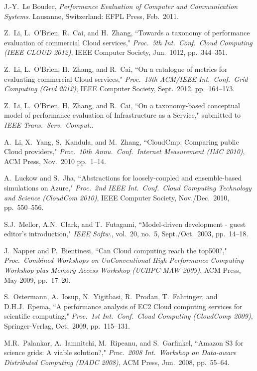 \documentclass[10pt, conference, compsocconf]{IEEEtran}
\begin{document}
\begin{thebibliography}{99}
J.-Y.~Le Boudec, \emph{Performance Evaluation of Computer and Communication Systems}. Lausanne, Switzerland: EFPL Press, Feb.~2011.

Z.~Li, L.~O'Brien, R.~Cai, and H.~Zhang, ``Towards a taxonomy of performance evaluation of commercial Cloud services," \emph{Proc.~5th Int.~Conf.~Cloud Computing (IEEE CLOUD 2012)}, IEEE Computer Society, Jun.~1012, pp.~344--351.

Z.~Li, L.~O'Brien, H.~Zhang, and R.~Cai, ``On a catalogue of metrics for evaluating commercial Cloud services," \emph{Proc.~13th ACM/IEEE Int.~Conf.~Grid Computing (Grid 2012)}, IEEE Computer Society, Sept.~2012, pp.~164--173.

Z.~Li, L.~O'Brien, H.~Zhang, and R.~Cai, ``On a taxonomy-based conceptual model of performance evaluation of Infrastructure as a Service," submitted to \emph{IEEE Trans.~Serv.~Comput.}.

A.~Li, X.~Yang, S.~Kandula, and M.~Zhang, ``CloudCmp: Comparing public Cloud providers," \emph{Proc.~10th Annu.~Conf.~Internet Measurement (IMC 2010)}, ACM Press, Nov.~2010 pp.~1--14.

A.~Luckow and S.~Jha, ``Abstractions for loosely-coupled and ensemble-based simulations on Azure," \emph{Proc.~2nd IEEE Int.~Conf.~Cloud Computing Technology and Science (CloudCom 2010)}, IEEE Computer Society, Nov./Dec.~2010, pp.~550--556.

S.J.~Mellor, A.N.~Clark, and T.~Futagami, ``Model-driven development - guest editor's introduction," \emph{IEEE Softw.}, vol.~20, no.~5, Sept./Oct.~2003, pp.~14--18.

J.~Napper and P.~Bientinesi, ``Can Cloud computing reach the top500?," \emph{Proc.~Combined Workshops on UnConventional High Performance Computing Workshop plus Memory Access Workshop (UCHPC-MAW 2009)}, ACM Press, May 2009, pp.~17--20.

S.~Ostermann, A.~Iosup, N.~Yigitbasi, R.~Prodan, T.~Fahringer, and D.H.J.~Epema, ``A performance analysis of EC2 Cloud computing services for scientific computing," \emph{Proc.~1st Int.~Conf.~Cloud Computing (CloudComp 2009)}, Springer-Verlag, Oct.~2009, pp.~115--131.

M.R.~Palankar, A.~Iamnitchi, M.~Ripeanu, and S.~Garfinkel, ``Amazon S3 for science grids: A viable solution?," \emph{Proc.~2008 Int.~Workshop on Data-aware Distributed Computing (DADC 2008)}, ACM Press, Jun.~2008, pp.~55--64.


\end{thebibliography}
\end{document}
